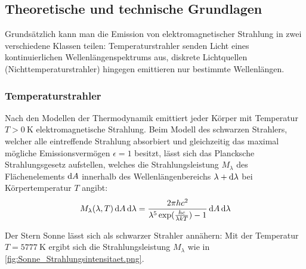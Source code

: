 \newpage

\subsection[Theoretische und technische Grundlagen]{Theoretische und technische Grundlagen \protect\autocite{Skript_2.1}}
Grundsätzlich kann man die Emission von elektromagnetischer Strahlung in zwei verschiedene Klassen teilen: Temperaturstrahler senden Licht eines kontinuierlichen Wellenlängenspektrums aus, diskrete Lichtquellen (Nichttemperaturstrahler) hingegen emittieren nur bestimmte Wellenlängen. 

\subsubsection{Temperaturstrahler}
Nach den Modellen der Thermodynamik emittiert jeder Körper mit Temperatur \(T>\qty{0}{\kelvin}\) elektromagnetische Strahlung. Beim Modell des schwarzen Strahlers, welcher alle eintreffende Strahlung absorbiert und gleichzeitig das maximal mögliche Emissionsvermögen \(\epsilon=1\) besitzt, lässt sich das Plancksche Strahlungsgesetz aufstellen, welches die Strahlungsleistung \(M_\lambda\) des Flächenelements \(\mathop{}\!\mathrm{d} A\) innerhalb des Wellenlängenbereichs \(\lambda+\mathop{}\!\mathrm{d} \lambda\) bei Körpertemperatur \(T\) angibt: 
\begin{equation}
    M_\lambda(\lambda,T) \mathop{}\!\mathrm{d} A \mathop{}\!\mathrm{d} \lambda= \frac{2\pi hc^2}{\lambda^5\exp(\frac{hc}{\lambda k T })-1}\mathop{}\!\mathrm{d} A \mathop{}\!\mathrm{d} \lambda
    \label{eq:PlanckschesGesetz}
\end{equation}

Der Stern Sonne lässt sich als schwarzer Strahler annähern: Mit der Temperatur \(T=\qty{5777}{\kelvin}\) ergibt sich die Strahlungsleistung \(M_\lambda\) wie in \cref{fig:Sonne_Strahlungsintensitaet.png}.


